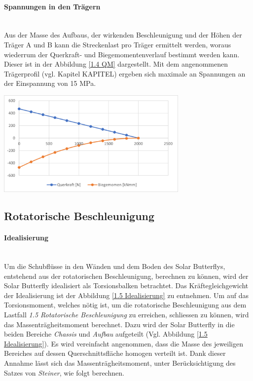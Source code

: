  \paragraph{Spannungen in den Trägern}\mbox{}\\
  Aus der Masse des Aufbaus, der wirkenden Beschleunigung und der Höhen der Träger A und B kann die Streckenlast pro Träger ermittelt werden, woraus wiederrum der Querkraft- und Biegemomentenverlauf bestimmt werden kann. Dieser ist in der Abbildung \ref{1.4 QM} dargestellt. Mit dem angenommenen Trägerprofil (vgl. Kapitel KAPITEL) ergeben sich maximale an Spannungen an der Einspannung von 15 MPa.

  \begin{center}
    \includegraphics[width=0.7\textwidth]{04_Figures/1.4 QM.png}
    \label{1.4 QM}
  \end{center}




\subsection{Rotatorische Beschleunigung}
\label{1.5 Rotatorische Beschleunigung}
\paragraph{Idealisierung}\mbox{}\\
Um die Schubflüsse in den Wänden und dem Boden des Solar Butterflys, entstehend aus der rotatorischen Beschleunigung, berechnen zu können, wird der Solar Butterfly idealisiert als Torsionsbalken betrachtet. Das Kräftegleichgewicht der Idealisierung ist der Abbildung \ref{1.5 Idealisierung} zu entnehmen. Um auf das Torsionsmoment, welches nötig ist, um die rotatorische Beschleunigung aus dem Lastfall \emph{1.5 Rotatorische Beschleunigung} zu erreichen, schliessen zu können, wird das Massenträgheitsmoment berechnet. Dazu wird der Solar Butterfly in die beiden Bereiche \emph{Chassis} und \emph{Aufbau} aufgeteilt (Vgl. Abbildung \ref{1.5 Idealisierung}). Es wird vereinfacht angenommen, dass die Masse des jeweiligen Bereiches auf dessen Querschnittsfläche homogen verteilt ist. Dank dieser Annahme lässt sich das Massenträgheitsmoment, unter Berücksichtigung des Satzes von \emph{Steiner}, wie folgt berechnen.

